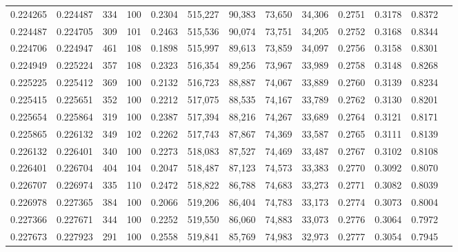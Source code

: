 \begin{tabular}{rrrrrrrrrrrrr}
0.224265 & 0.224487 &   334 & 100 &                                     0.2304 & 515,227 &  90,383 &  73,650 &  34,306 & 0.2751 & 0.3178 & 0.8372 \\
0.224487 & 0.224705 &   309 & 101 &                                     0.2463 & 515,536 &  90,074 &  73,751 &  34,205 & 0.2752 & 0.3168 & 0.8344 \\
0.224706 & 0.224947 &   461 & 108 &                                     0.1898 & 515,997 &  89,613 &  73,859 &  34,097 & 0.2756 & 0.3158 & 0.8301 \\
0.224949 & 0.225224 &   357 & 108 &                                     0.2323 & 516,354 &  89,256 &  73,967 &  33,989 & 0.2758 & 0.3148 & 0.8268 \\
0.225225 & 0.225412 &   369 & 100 &                                     0.2132 & 516,723 &  88,887 &  74,067 &  33,889 & 0.2760 & 0.3139 & 0.8234 \\
0.225415 & 0.225651 &   352 & 100 &                                     0.2212 & 517,075 &  88,535 &  74,167 &  33,789 & 0.2762 & 0.3130 & 0.8201 \\
0.225654 & 0.225864 &   319 & 100 &                                     0.2387 & 517,394 &  88,216 &  74,267 &  33,689 & 0.2764 & 0.3121 & 0.8171 \\
0.225865 & 0.226132 &   349 & 102 &                                     0.2262 & 517,743 &  87,867 &  74,369 &  33,587 & 0.2765 & 0.3111 & 0.8139 \\
0.226132 & 0.226401 &   340 & 100 &                                     0.2273 & 518,083 &  87,527 &  74,469 &  33,487 & 0.2767 & 0.3102 & 0.8108 \\
0.226401 & 0.226704 &   404 & 104 &                                     0.2047 & 518,487 &  87,123 &  74,573 &  33,383 & 0.2770 & 0.3092 & 0.8070 \\
0.226707 & 0.226974 &   335 & 110 &                                     0.2472 & 518,822 &  86,788 &  74,683 &  33,273 & 0.2771 & 0.3082 & 0.8039 \\
0.226978 & 0.227365 &   384 & 100 &                                     0.2066 & 519,206 &  86,404 &  74,783 &  33,173 & 0.2774 & 0.3073 & 0.8004 \\
0.227366 & 0.227671 &   344 & 100 &                                     0.2252 & 519,550 &  86,060 &  74,883 &  33,073 & 0.2776 & 0.3064 & 0.7972 \\
0.227673 & 0.227923 &   291 & 100 &                                     0.2558 & 519,841 &  85,769 &  74,983 &  32,973 & 0.2777 & 0.3054 & 0.7945 \\

\end{tabular}
